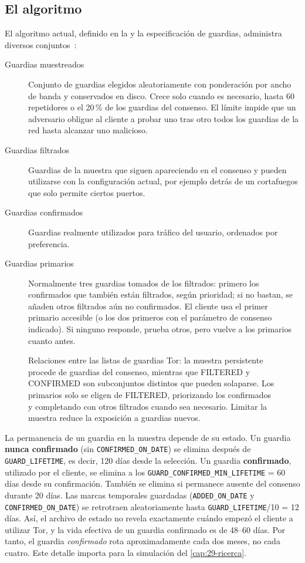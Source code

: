 \subsection{El algoritmo}

El algoritmo actual, definido en la  y la especificación de guardias, administra diversos conjuntos~:
\begin{description}
  \item[Guardias muestreados] Conjunto de guardias elegidos aleatoriamente con ponderación por ancho de banda y conservados en disco. Crece solo cuando es necesario, hasta 60 repetidores o el 20\,\% de los guardias del consenso. El límite impide que un adversario obligue al cliente a probar uno tras otro todos los guardias de la red hasta alcanzar uno malicioso.
  \item[Guardias filtrados] Guardias de la muestra que siguen apareciendo en el consenso y pueden utilizarse con la configuración actual, por ejemplo detrás de un cortafuegos que solo permite ciertos puertos.
  \item[Guardias confirmados] Guardias realmente utilizados para tráfico del usuario, ordenados por preferencia.
  \item[Guardias primarios] Normalmente tres guardias tomados de los filtrados: primero los confirmados que también están filtrados, según prioridad; si no bastan, se añaden otros filtrados aún no confirmados. El cliente usa el primer primario accesible (o los dos primeros con el parámetro de consenso indicado). Si ninguno responde, prueba otros, pero vuelve a los primarios cuanto antes.
\end{description}

\begin{figure}[htbp]
\centering

\caption{Relaciones entre las listas de guardias Tor: la muestra persistente procede de guardias del consenso, mientras que FILTERED y CONFIRMED son subconjuntos distintos que pueden solaparse. Los primarios solo se eligen de FILTERED, priorizando los confirmados y completando con otros filtrados cuando sea necesario. Limitar la muestra reduce la exposición a guardias nuevos.}
\label{fig:guard}
\end{figure}

La permanencia de un guardia en la muestra depende de su estado. Un guardia \textbf{nunca confirmado} (sin \texttt{CONFIRMED\_ON\_DATE}) se elimina después de \texttt{GUARD\_LIFETIME}, es decir, 120 días desde la selección. Un guardia \textbf{confirmado}, utilizado por el cliente, se elimina a los \texttt{GUARD\_CONFIRMED\_MIN\_LIFETIME} = 60 días desde su confirmación. También se elimina si permanece ausente del consenso durante 20 días. Las marcas temporales guardadas (\texttt{ADDED\_ON\_DATE} y \texttt{CONFIRMED\_ON\_DATE}) se retrotraen aleatoriamente hasta \texttt{GUARD\_LIFETIME}/10 = 12 días. Así, el archivo de estado no revela exactamente cuándo empezó el cliente a utilizar Tor, y la vida efectiva de un guardia confirmado es de 48--60 días. Por tanto, el guardia \emph{confirmado} rota aproximadamente cada dos meses, no cada cuatro. Este detalle importa para la simulación del \cref{cap:29-ricerca}.

